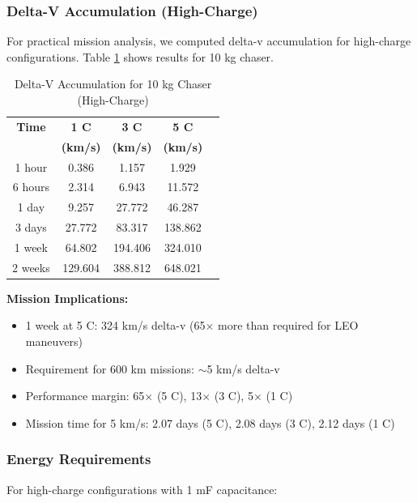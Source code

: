 \documentclass[12pt,a4paper]{article}
\begin{document}
\subsubsection{Delta-V Accumulation (High-Charge)}

For practical mission analysis, we computed delta-v accumulation for high-charge configurations. Table \ref{tab:delta_v} shows results for 10 kg chaser.

\begin{table}[H]
\centering
\caption{Delta-V Accumulation for 10 kg Chaser (High-Charge)}
\label{tab:delta_v}
\begin{tabular}{@{}ccccc@{}}
\toprule
\textbf{Time} & \textbf{1 C} & \textbf{3 C} & \textbf{5 C} \\
              & \textbf{(km/s)} & \textbf{(km/s)} & \textbf{(km/s)} \\ \midrule
1 hour  & 0.386 & 1.157 & 1.929 \\
6 hours & 2.314 & 6.943 & 11.572 \\
1 day   & 9.257 & 27.772 & 46.287 \\
3 days  & 27.772 & 83.317 & 138.862 \\
1 week  & 64.802 & 194.406 & 324.010 \\
2 weeks & 129.604 & 388.812 & 648.021 \\ \bottomrule
\end{tabular}
\end{table}

\textbf{Mission Implications:}
\begin{itemize}
\item 1 week at 5 C: 324 km/s delta-v (65$\times$ more than required for LEO maneuvers)
\item Requirement for 600 km missions: $\sim$5 km/s delta-v
\item Performance margin: 65$\times$ (5 C), 13$\times$ (3 C), 5$\times$ (1 C)
\item Mission time for 5 km/s: 2.07 days (5 C), 2.08 days (3 C), 2.12 days (1 C)
\end{itemize}

\subsubsection{Energy Requirements}

For high-charge configurations with 1 mF capacitance:
\end{document}
